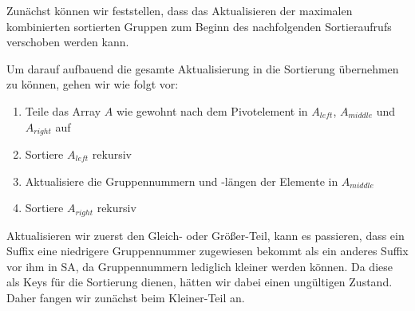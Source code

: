 Zunächst können wir feststellen, dass das Aktualisieren der maximalen kombinierten sortierten Gruppen zum Beginn des nachfolgenden Sortieraufrufs verschoben werden kann.  

Um darauf aufbauend die gesamte Aktualisierung in die Sortierung übernehmen zu können, gehen wir wie folgt vor:
\begin{enumerate}
\item Teile das Array $A$ wie gewohnt nach dem Pivotelement in $A_{left}$, $A_{middle}$ und $A_{right}$ auf
\item Sortiere $A_{left}$ rekursiv
\item Aktualisiere die Gruppennummern und -längen der Elemente in $A_{middle}$
\item Sortiere $A_{right}$ rekursiv
\end{enumerate}

Aktualisieren wir zuerst den \glqq Gleich\grqq{}- oder \glqq Größer\grqq{}-Teil, kann es passieren, dass 
ein Suffix eine niedrigere Gruppennummer zugewiesen bekommt als ein anderes Suffix vor ihm in SA, da 
Gruppennummern lediglich kleiner werden können. Da diese als Keys für die Sortierung dienen, hätten wir dabei einen ungültigen Zustand. Daher fangen wir zunächst beim \glqq Kleiner\grqq{}-Teil an. 


